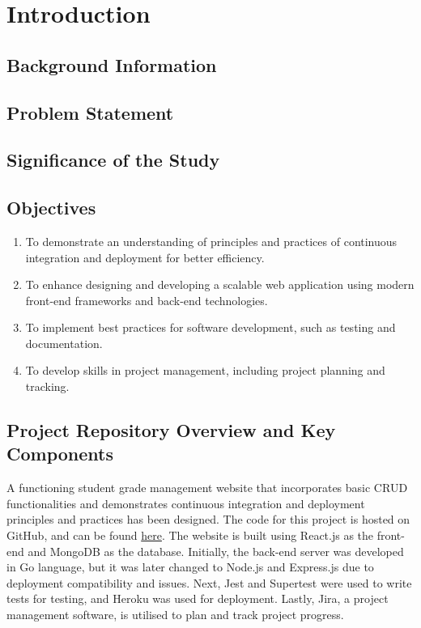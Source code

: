 \chapter{Introduction}

\section{Background Information}

\section{Problem Statement}

\section{Significance of the Study}


\section{Objectives}
\begin{enumerate}
  \item To demonstrate an understanding of principles and practices of continuous integration and deployment for better efficiency.
  \item To enhance designing and developing a scalable web application using modern front-end frameworks and back-end technologies.
  \item To implement best practices for software development, such as testing and documentation.
  \item To develop skills in project management, including project planning and tracking.
\end{enumerate}

\section{Project Repository Overview and Key Components}
A functioning student grade management website that incorporates basic CRUD functionalities and demonstrates continuous integration and deployment principles and practices has been designed. The code for this project is hosted on GitHub, and can be found \href{https://github.com/gabhang/final-year-project}{here}. The website is built using React.js as the front-end and MongoDB as the database. Initially, the back-end server was developed in Go language, but it was later changed to Node.js and Express.js due to deployment compatibility and issues. Next, Jest and Supertest were used to write tests for testing, and Heroku was used for deployment. Lastly, Jira, a project management software, is utilised to plan and track project progress.

